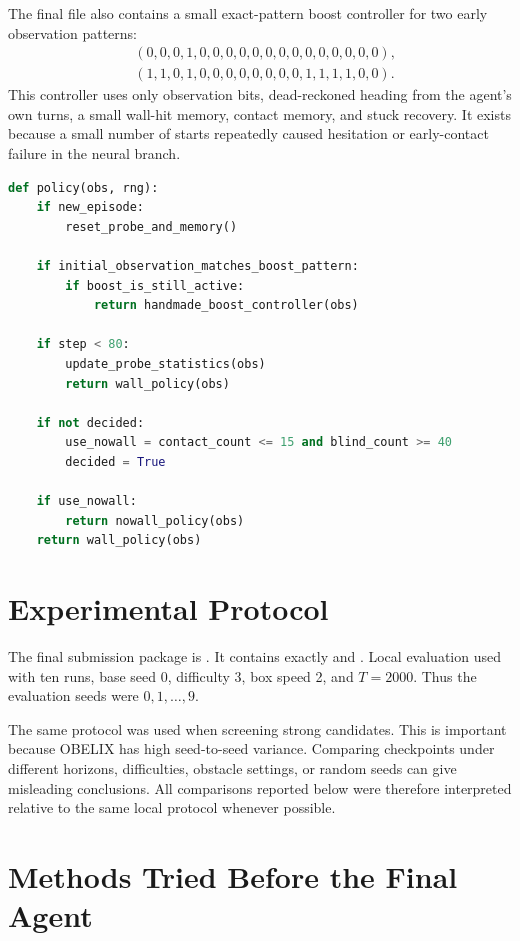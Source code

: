 \documentclass[11pt]{article}
\begin{document}
The final file also contains a small exact-pattern boost controller for two early
observation patterns:
\[
\begin{aligned}
  &(0,0,0,1,0,0,0,0,0,0,0,0,0,0,0,0,0,0),\\
  &(1,1,0,1,0,0,0,0,0,0,0,0,1,1,1,1,0,0).
\end{aligned}
\]
This controller uses only observation bits, dead-reckoned heading from the agent's own
turns, a small wall-hit memory, contact memory, and stuck recovery. It exists because a
small number of starts repeatedly caused hesitation or early-contact failure in the neural
branch.

\begin{lstlisting}[language=Python,caption={High-level final policy logic.}]
def policy(obs, rng):
    if new_episode:
        reset_probe_and_memory()

    if initial_observation_matches_boost_pattern:
        if boost_is_still_active:
            return handmade_boost_controller(obs)

    if step < 80:
        update_probe_statistics(obs)
        return wall_policy(obs)

    if not decided:
        use_nowall = contact_count <= 15 and blind_count >= 40
        decided = True

    if use_nowall:
        return nowall_policy(obs)
    return wall_policy(obs)
\end{lstlisting}

\section{Experimental Protocol}

The final submission package is
. It
contains exactly  and . Local evaluation used
 with ten runs, base seed 0, difficulty 3, box speed 2, and
\(T=2000\). Thus the evaluation seeds were \(0,1,\ldots,9\).

The same protocol was used when screening strong candidates. This is important because
OBELIX has high seed-to-seed variance. Comparing checkpoints under different horizons,
difficulties, obstacle settings, or random seeds can give misleading conclusions. All
comparisons reported below were therefore interpreted relative to the same local
protocol whenever possible.

\section{Methods Tried Before the Final Agent}
\end{document}
